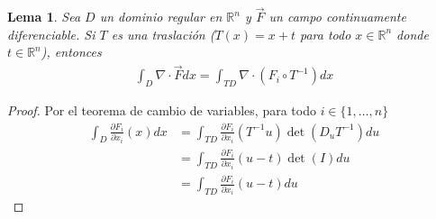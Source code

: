 \documentclass{report}
\newcommand{\realNumbers}{\mathbb{R}}
\newtheorem{lemma}{Lema}
\theoremstyle{definition}
\theoremstyle{remark}
\begin{document}
  \begin{lemma}
    Sea \(D\) un dominio regular en \(\realNumbers^n\) y \(\vec{F}\)  un campo continuamente diferenciable.
    Si \(T\) es una traslación (\(T(x) = x + t\) para todo \(x \in \realNumbers^n\) donde \(t \in \realNumbers^n\)), entonces
    \begin{align}
      \int_D
        \nabla \cdot \vec{F}
      dx
      =
      \int_{T D}
        \nabla \cdot (F_i \circ T^{- 1})
      dx
    \end{align}
  \end{lemma}
  \begin{proof}
    Por el teorema de cambio de variables, para todo \(i \in \{1, \dots, n\}\)
    \begin{align}
      \int_D \frac{\partial F_i}{\partial x_i}(x) dx
      &=
      \int_{T D}
        \frac{\partial F_i}{\partial x_i}(T^{- 1} u)
        \det\left(D_u T^{-1}\right)
      du
      \\
      &=
      \int_{T D}
        \frac{\partial F_i}{\partial x_i}(u - t)
        \det(I)
      du
      \\
      &=
      \int_{T D}
        \frac{\partial F_i}{\partial x_i}(u - t)
      du
    \end{align}
  \end{proof}
\end{document}
